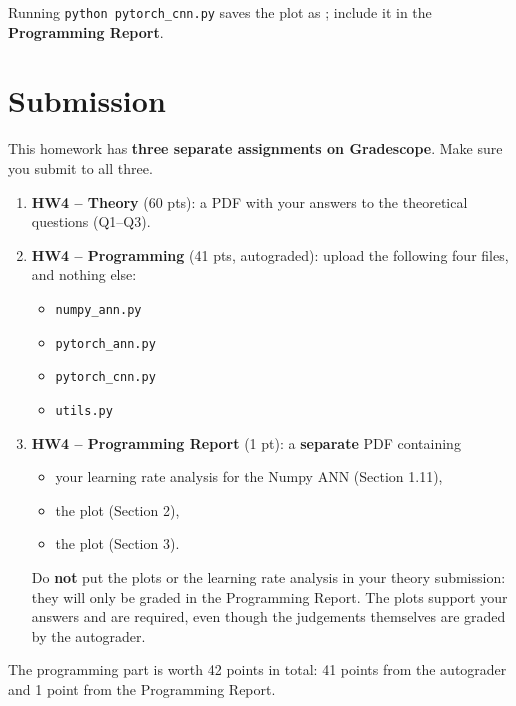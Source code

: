 \documentclass[11pt]{exam}
\begin{document}
Running \verb|python pytorch_cnn.py| saves the plot as ; include it in the \textbf{Programming Report}.

\clearpage
\section*{Submission}

This homework has \textbf{three separate assignments on Gradescope}. Make sure you submit to all three.

\begin{enumerate}
    \item \textbf{HW4 -- Theory} (60 pts): a PDF with your answers to the theoretical questions (Q1--Q3).
    \item \textbf{HW4 -- Programming} (41 pts, autograded): upload the following four files, and nothing else:
    \begin{itemize}
        \item \verb|numpy_ann.py|
        \item \verb|pytorch_ann.py|
        \item \verb|pytorch_cnn.py|
        \item \verb|utils.py|
    \end{itemize}
    \item \textbf{HW4 -- Programming Report} (1 pt): a \textbf{separate} PDF containing
    \begin{itemize}
        \item your learning rate analysis for the Numpy ANN (Section 1.11),
        \item the plot  (Section 2),
        \item the plot  (Section 3).
    \end{itemize}
    Do \textbf{not} put the plots or the learning rate analysis in your theory submission: they will only be graded in the Programming Report. The plots support your  answers and are required, even though the judgements themselves are graded by the autograder.
\end{enumerate}

The programming part is worth 42 points in total: 41 points from the autograder and 1 point from the Programming Report.
\end{document}
